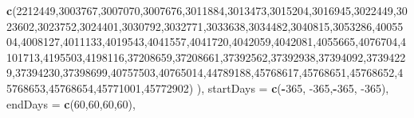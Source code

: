 \documentclass[
]{article}
\newenvironment{Shaded}{\begin{snugshade}}{\end{snugshade}}
\newcommand{\DataTypeTok}[1]{\textcolor[rgb]{0.13,0.29,0.53}{#1}}
\newcommand{\DecValTok}[1]{\textcolor[rgb]{0.00,0.00,0.81}{#1}}
\newcommand{\KeywordTok}[1]{\textcolor[rgb]{0.13,0.29,0.53}{\textbf{#1}}}
\newcommand{\NormalTok}[1]{#1}
\newcommand{\OperatorTok}[1]{\textcolor[rgb]{0.81,0.36,0.00}{\textbf{#1}}}
\begin{document}
\begin{Shaded}
\begin{Highlighting}[]
                                                                             \KeywordTok{c}\NormalTok{(}\DecValTok{2212449}\NormalTok{,}\DecValTok{3003767}\NormalTok{,}\DecValTok{3007070}\NormalTok{,}\DecValTok{3007676}\NormalTok{,}\DecValTok{3011884}\NormalTok{,}\DecValTok{3013473}\NormalTok{,}\DecValTok{3015204}\NormalTok{,}\DecValTok{3016945}\NormalTok{,}\DecValTok{3022449}\NormalTok{,}\DecValTok{3023602}\NormalTok{,}\DecValTok{3023752}\NormalTok{,}\DecValTok{3024401}\NormalTok{,}\DecValTok{3030792}\NormalTok{,}\DecValTok{3032771}\NormalTok{,}\DecValTok{3033638}\NormalTok{,}\DecValTok{3034482}\NormalTok{,}\DecValTok{3040815}\NormalTok{,}\DecValTok{3053286}\NormalTok{,}\DecValTok{4005504}\NormalTok{,}\DecValTok{4008127}\NormalTok{,}\DecValTok{4011133}\NormalTok{,}\DecValTok{4019543}\NormalTok{,}\DecValTok{4041557}\NormalTok{,}\DecValTok{4041720}\NormalTok{,}\DecValTok{4042059}\NormalTok{,}\DecValTok{4042081}\NormalTok{,}\DecValTok{4055665}\NormalTok{,}\DecValTok{4076704}\NormalTok{,}\DecValTok{4101713}\NormalTok{,}\DecValTok{4195503}\NormalTok{,}\DecValTok{4198116}\NormalTok{,}\DecValTok{37208659}\NormalTok{,}\DecValTok{37208661}\NormalTok{,}\DecValTok{37392562}\NormalTok{,}\DecValTok{37392938}\NormalTok{,}\DecValTok{37394092}\NormalTok{,}\DecValTok{37394229}\NormalTok{,}\DecValTok{37394230}\NormalTok{,}\DecValTok{37398699}\NormalTok{,}\DecValTok{40757503}\NormalTok{,}\DecValTok{40765014}\NormalTok{,}\DecValTok{44789188}\NormalTok{,}\DecValTok{45768617}\NormalTok{,}\DecValTok{45768651}\NormalTok{,}\DecValTok{45768652}\NormalTok{,}\DecValTok{45768653}\NormalTok{,}\DecValTok{45768654}\NormalTok{,}\DecValTok{45771001}\NormalTok{,}\DecValTok{45772902}\NormalTok{)}
\NormalTok{                                                          ),}
                                                          \DataTypeTok{startDays =} \KeywordTok{c}\NormalTok{(}\OperatorTok{-}\DecValTok{365}\NormalTok{, }\DecValTok{-365}\NormalTok{,}\OperatorTok{-}\DecValTok{365}\NormalTok{, }\DecValTok{-365}\NormalTok{),}
                                                          \DataTypeTok{endDays =} \KeywordTok{c}\NormalTok{(}\DecValTok{60}\NormalTok{,}\DecValTok{60}\NormalTok{,}\DecValTok{60}\NormalTok{,}\DecValTok{60}\NormalTok{),}

\end{Highlighting}
\end{Shaded}
\end{document}
